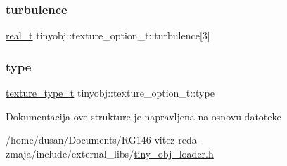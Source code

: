 \subsubsection{\texorpdfstring{turbulence}{turbulence}}
{\footnotesize\ttfamily \hyperlink{namespacetinyobj_ad5ca7469ff56bf0d8423120cfd99adce}{real\+\_\+t} tinyobj\+::texture\+\_\+option\+\_\+t\+::turbulence\mbox{[}3\mbox{]}}

\mbox{\label{structtinyobj_1_1texture__option__t_ae93ebf5f70b1b3e3c1de58a257157e00}} 
\subsubsection{\texorpdfstring{type}{type}}
{\footnotesize\ttfamily \hyperlink{namespacetinyobj_a5c9f207e1f880a48bac0a3b69f16d7f8}{texture\+\_\+type\+\_\+t} tinyobj\+::texture\+\_\+option\+\_\+t\+::type}



Dokumentacija ove strukture je napravljena na osnovu datoteke \begin{DoxyCompactItemize}
\item 
/home/dusan/\+Documents/\+R\+G146-\/vitez-\/reda-\/zmaja/include/external\+\_\+libs/\hyperlink{tiny__obj__loader_8h}{tiny\+\_\+obj\+\_\+loader.\+h}\end{DoxyCompactItemize}
